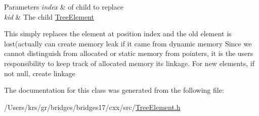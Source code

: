 \begin{DoxyParams}{Parameters}
{\em index} & of child to replace \\
\hline
{\em kid} & The child \hyperlink{classbridges_1_1_tree_element}{Tree\+Element} \\
\hline
\end{DoxyParams}
This simply replaces the element at position index and the old element is lost(actually can create memory leak if it came from dynamic memory Since we cannot distinguish from allocated or static memory from pointers, it is the user\textquotesingle{}s responsibility to keep track of allocated memory its linkage. For new elements, if not null, create linkage

The documentation for this class was generated from the following file\+:\begin{DoxyCompactItemize}
\item 
/\+Users/krs/gr/bridges/bridges17/cxx/src/\hyperlink{_tree_element_8h}{Tree\+Element.\+h}\end{DoxyCompactItemize}

